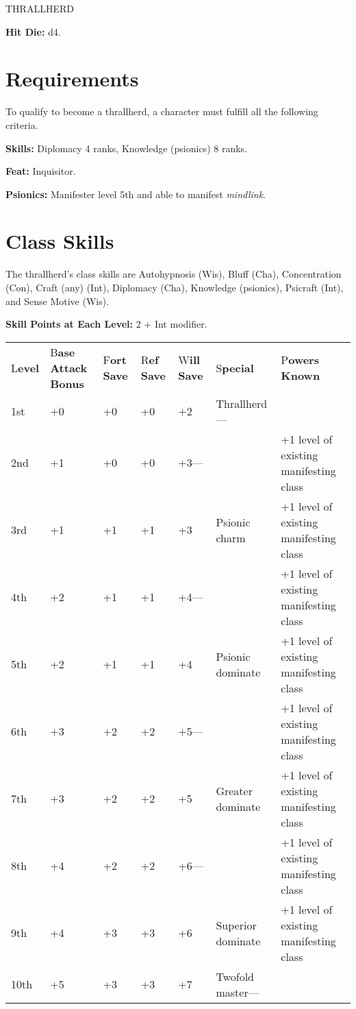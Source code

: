 \documentclass{article}
\begin{document}
\vspace{12pt}
{\LARGE{}THRALLHERD}

\textbf{Hit Die:} d4.

\vspace{12pt}
\section*{\textbf{Requirements}}

To qualify to become a thrallherd, a character must fulfill all the following criteria.

\textbf{Skills:} Diplomacy 4 ranks, Knowledge (psionics) 8 ranks. 

\textbf{Feat:} Inquisitor.

\textbf{Psionics:} Manifester level 5th and able to manifest \textit{mindlink}.

\vspace{12pt}
\section*{\textbf{Class Skills}}

The thrallherd's class skills are Autohypnosis (Wis), Bluff (Cha), Concentration 
(Con), Craft (any) (Int), Diplomacy (Cha), Knowledge (psionics), Psicraft (Int), 
and Sense Motive (Wis).

\textbf{Skill Points at Each Level:} 2 + Int modifier.

\vspace{12pt}
\begin{tabular}{|>{\raggedright}p{16pt}|>{\raggedright}p{35pt}|>{\raggedright}p{20pt}|>{\raggedright}p{18pt}|>{\raggedright}p{23pt}|>{\raggedright}p{52pt}|>{\raggedright}p{99pt}|}
\hline
\multicolumn{7}{|p{266pt}|}{\section*{T\textbf{able: The Thrallherd}}}\tabularnewline
\hline
L\textbf{evel} & B\textbf{ase Attack Bonus} & F\textbf{ort Save} & R\textbf{ef 
Save} & W\textbf{ill Save} & S\textbf{pecial} & P\textbf{owers Known}\tabularnewline
\hline
1st & +0 & +0 & +0 & +2 & Thrallherd--- & \tabularnewline
\hline
2nd & +1 & +0 & +0 & +3--- &  & +1 level of existing manifesting class\tabularnewline
\hline
3rd & +1 & +1 & +1 & +3 & Psionic charm & +1 level of existing manifesting class\tabularnewline
\hline
4th & +2 & +1 & +1 & +4--- &  & +1 level of existing manifesting class\tabularnewline
\hline
5th & +2 & +1 & +1 & +4 & Psionic dominate & +1 level of existing manifesting class\tabularnewline
\hline
6th & +3 & +2 & +2 & +5--- &  & +1 level of existing manifesting class\tabularnewline
\hline
7th & +3 & +2 & +2 & +5 & Greater dominate & +1 level of existing manifesting class\tabularnewline
\hline
8th & +4 & +2 & +2 & +6--- &  & +1 level of existing manifesting class\tabularnewline
\hline
9th & +4 & +3 & +3 & +6 & Superior dominate & +1 level of existing manifesting 
class\tabularnewline
\hline
10th & +5 & +3 & +3 & +7 & Twofold master--- & \tabularnewline
\hline
\end{tabular}
\end{document}
